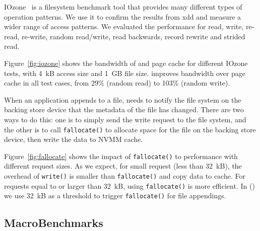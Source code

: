 IOzone~\cite{IOzone} is a filesystem benchmark tool that provides many different types of 
operation patterns. We use it to confirm the results from xdd and measure a wider range of access patterns.  We evaluated the performance for read, write,
re-read, re-write, random read/write, read backwards, record rewrite and
strided read.

Figure~\ref{fig:iozone} shows the bandwidth of \CChell{} and page cache
for different IOzone tests, with 4~kB access size and 1~GB file size.
\CChell{} improves bandwidth over page cache in all test cases,
from 29\% (random read) to 103\% (random write).


When an application appends to a file, \CChell{} needs to notify the file system
on the backing store device that the metadata of the file has changed. There
are two ways to do this: one is to simply send the write request to the file
system, and the other is to call \texttt{fallocate()} to allocate space for
the file on the backing store device, then write the data to NVMM cache.


Figure~\ref{fig:fallocate} shows the impact of \texttt{fallocate()}
to \CChell{} performance with different request sizes. As we expect, for small
request (less than 32~kB), the overhead of \texttt{write()} is smaller than 
\texttt{fallocate()} and copy data to cache.  For requests equal to or larger
than 32~kB, using \texttt{fallocate()} is more efficient.  In \CChell() we use
32~kB as a threshold to trigger \texttt{fallocate()} for file appendings.



\subsection{MacroBenchmarks}
\label{sec:macrobenchmark}



